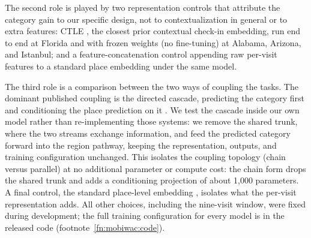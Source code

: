 The second role is played by two representation controls that attribute the category gain to our specific design, not to contextualization in general or to extra features: CTLE \cite{lin2021ctle}, the closest prior contextual check-in embedding, run end to end at Florida and with frozen weights (no fine-tuning) at Alabama, Arizona, and Istanbul; and a feature-concatenation control appending raw per-visit features to a standard place embedding under the same model.

The third role is a comparison between the two ways of coupling the tasks. The dominant published coupling is the directed cascade, predicting the category first and conditioning the place prediction on it \cite{ye2013nextmove,yu2020catdm,huang2024cslsl}. We test the cascade inside our own model rather than re-implementing those systems: we remove the shared trunk, where the two streams exchange information, and feed the predicted category forward into the region pathway, keeping the representation, outputs, and training configuration unchanged. This isolates the coupling topology (chain versus parallel) at no additional parameter or compute cost: the chain form drops the shared trunk and adds a conditioning projection of about 1,000 parameters. A final control, the standard place-level embedding \cite{huang2023hgi}, isolates what the per-visit representation adds. All other choices, including the nine-visit window, were fixed during development; the full training configuration for every model is in the released code (footnote~\ref{fn:mobiwac:code}).
